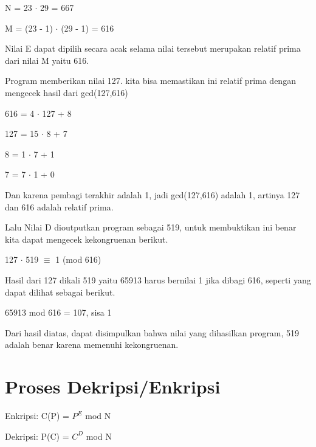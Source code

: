\documentclass[11pt, a4paper]{article}
\begin{document}
\begin{center}
N = 23 $\cdot$ 29 = 667

M = (23 - 1) $\cdot$ (29 - 1) = 616
\end{center}

Nilai E dapat dipilih secara acak selama nilai tersebut merupakan relatif prima
dari nilai M yaitu 616.

Program memberikan nilai 127. kita bisa memastikan ini relatif prima dengan
mengecek hasil dari gcd(127,616)

\begin{center}
616 = 4 $\cdot$ 127 + 8

127 = 15 $\cdot$ 8 + 7

8 = 1 $\cdot$ 7 + 1

7 = 7 $\cdot$ 1 + 0
\end{center}

Dan karena pembagi terakhir adalah 1, jadi gcd(127,616) adalah 1, artinya
127 dan 616 adalah relatif prima.

\vspace{0.5cm}

Lalu Nilai D dioutputkan program sebagai 519, untuk membuktikan ini benar
kita dapat mengecek kekongruenan berikut.

\begin{center}
127 $\cdot$ 519 $\equiv$ 1 (mod 616)
\end{center}


Hasil dari 127 dikali 519 yaitu 65913 harus bernilai 1 jika dibagi 616, seperti yang
dapat dilihat sebagai berikut.

\begin{center}
65913 mod 616 = 107, sisa 1
\end{center}

Dari hasil diatas, dapat disimpulkan bahwa nilai yang dihasilkan program, 519
adalah benar karena memenuhi kekongruenan.

\newpage

\section*{Proses Dekripsi/Enkripsi}

\begin{center}

Enkripsi: C(P) = $P^{E}$ mod N

Dekripsi: P(C) = $C^{D}$ mod N

\end{center}
\end{document}
